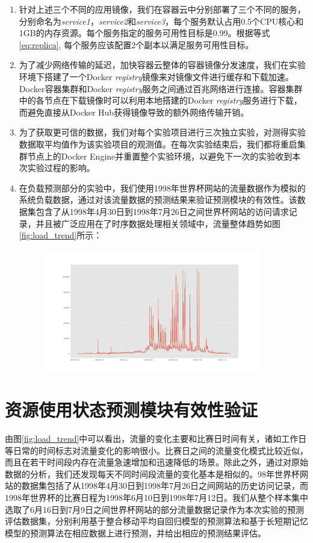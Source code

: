 \begin{enumerate}
\item\label{req:serv_aval} 针对上述三个不同的应用镜像，我们在容器云中分别部署了三个不同的服务，分别命名为\emph{service1}，\emph{service2}和\emph{service3}，每个服务默认占用0.5个CPU核心和1GB的内存资源。每个服务指定的服务可用性目标是0.99。根据等式\ref{eq:replica}, 每个服务应该配置2个副本以满足服务可用性目标。
\item\label{req:registry_mirror} 为了减少网络传输的延迟，加快容器云整体的容器镜像分发速度，我们在实验环境下搭建了一个Docker \emph{registry}镜像来对镜像文件进行缓存和下载加速。Docker容器集群和Docker \emph{registry}服务之间通过百兆网络进行连接。容器集群中的各节点在下载镜像时可以利用本地搭建的Docker \emph{registry}服务进行下载，而避免直接从Docker Hub获得镜像导致的额外网络传输开销。
\item 为了获取更可信的数据，我们对每个实验项目进行三次独立实验，对测得实验数据取平均值作为该实验项目的观测值。在每次实验结束后，我们都将重启集群节点上的Docker Engine并重置整个实验环境，以避免下一次的实验收到本次实验过程的影响。
\item 在负载预测部分的实验中，我们使用1998年世界杯网站的流量数据作为模拟的系统负载数据，通过对该流量数据的预测结果来验证预测模块的有效性。该数据集包含了从1998年4月30日到1998年7月26日之间世界杯网站的访问请求记录，并且被广泛应用在了时序数据处理相关领域中，流量整体趋势如图\ref{fig:load_trend}所示：
\begin{figure}[htbp]
\centering
\includegraphics[width=0.9\textwidth]{./figure/alldata}
\end{figure}
\end{enumerate}

\section{资源使用状态预测模块有效性验证}
由图\ref{fig:load_trend}中可以看出，流量的变化主要和比赛日时间有关，诸如工作日等日常的时间标志对流量变化的影响很小。比赛日之间的流量变化模式比较近似，而且在若干时间段内存在流量急速增加和迅速降低的场景。除此之外，通过对原始数据的分析，我们还发现每天不同时间段流量的变化基本是相似的。98年世界杯网站的数据集包括了从1998年4月30日到1998年7月26日之间网站的历史访问记录，而1998年世界杯的比赛日程为1998年6月10日到1998年7月12日。我们从整个样本集中选取了6月16日到7月9日之间世界杯网站的部分流量数据记录作为本次实验的预测评估数据集，分别利用基于整合移动平均自回归模型的预测算法和基于长短期记忆模型的预测算法在相应数据上进行预测，并给出相应的预测结果评估。

